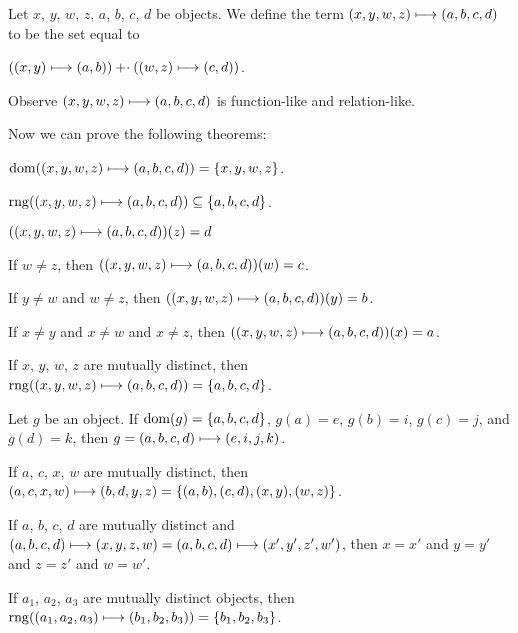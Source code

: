 \documentclass{article}
\begin{document}
\begin{definition}
Let $x$, $y$, $w$, $z$, $a$, $b$, $c$, $d$ be objects.
We define the term $(x,y,w,z)\longmapsto(a,b,c,d)$ to be the set equal
to
\begin{defn}
\item $((x,y)\longmapsto(a,b))\mathbin{\mathord{+}\cdot}((w,z)\longmapsto(c,d))$.
\end{defn}
\end{definition}
Observe $(x,y,w,z)\longmapsto(a,b,c,d)$ is function-like and relation-like.

Now we can prove the following theorems:
\begin{thm}
\item\label{funct4:137} $\operatorname{dom}((x,y,w,z)\longmapsto(a,b,c,d))=\{x,y,w,z\}$.
\item\label{funct4:138} $\operatorname{rng}((x,y,w,z)\longmapsto(a,b,c,d))\subseteq\{a,b,c,d\}$.
\item\label{funct4:139} $((x,y,w,z)\longmapsto(a,b,c,d))(z)=d$
\item\label{funct4:140} If $w\neq z$, then
  $((x,y,w,z)\longmapsto(a,b,c,d))(w)=c$.
\item\label{funct4:141} If $y\neq w$ and $w\neq z$, then
  $((x,y,w,z)\longmapsto(a,b,c,d))(y)=b$.
\item\label{funct4:142} If $x\neq y$ and $x\neq w$ and $x\neq z$, then 
  $((x,y,w,z)\longmapsto(a,b,c,d))(x)=a$.
\item\label{funct4:143} If $x$, $y$, $w$, $z$ are mutually distinct,
  then $\operatorname{rng}((x,y,w,z)\longmapsto(a,b,c,d))=\{a,b,c,d\}$.
\item\label{funct4:144} Let $g$ be an object.
  If $\operatorname{dom}(g)=\{a,b,c,d\}$, $g(a)=e$, $g(b)=i$, $g(c)=j$, and $g(d)=k$,
  then $g=(a,b,c,d)\longmapsto(e,i,j,k)$.
\item\label{funct4:145} If $a$, $c$, $x$, $w$ are mutually distinct,
  then $(a,c,x,w)\longmapsto(b,d,y,z)=\{(a,b),(c,d),(x,y),(w,z)\}$.
\item\label{funct4:146} If $a$, $b$, $c$, $d$ are mutually distinct
  and $(a,b,c,d)\longmapsto(x,y,z,w)=(a,b,c,d)\longmapsto(x',y',z',w')$,
  then $x=x'$ and $y=y'$ and $z=z'$ and $w=w'$.
\item\label{funct4:147} If $a_{1}$, $a_{2}$, $a_{3}$ are mutually
  distinct objects, then $\operatorname{rng}((a_{1},a_{2},a_{3})\longmapsto(b_{1},b_{2},b_{3}))=\{b_{1},b_{2},b_{3}\}$.
\end{thm}
\end{document}
